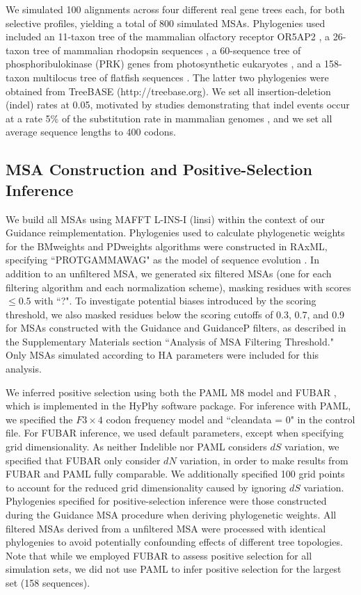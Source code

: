 \documentclass[11pt]{article}
\begin{document}
We simulated 100 alignments across four different real gene trees each, for both selective profiles, yielding a total of 800 simulated MSAs. Phylogenies used included an 11-taxon tree of the mammalian olfactory receptor OR5AP2 \citep{Spielman2013}, a 26-taxon tree of mammalian rhodopsin sequences \citep{Spielman2013}, a 60-sequence tree of phosphoribulokinase (PRK) genes from photosynthetic eukaryotes \citep{Yang2011}, and a 158-taxon multilocus tree of flatfish sequences \citep{Betancur2013}. The latter two phylogenies were obtained from TreeBASE (http://treebase.org). We set all insertion-deletion (indel) rates at 0.05, motivated by studies demonstrating that indel events occur at a rate 5\% of the substitution rate in mammalian genomes \citep{Cooper2004}, and we set all average sequence lengths to 400 codons.

\subsection*{MSA Construction and Positive-Selection Inference}

We build all MSAs using MAFFT L-INS-I (linsi) \citep{Katoh2002,Katoh2005} within the context of our Guidance reimplementation. Phylogenies used to calculate phylogenetic weights for the BMweights and PDweights algorithms were constructed in RAxML, specifying ``PROTGAMMAWAG" as the model of sequence evolution \citep{Stamatakis2006}. In addition to an unfiltered MSA, we generated six filtered MSAs (one for each filtering algorithm and each normalization scheme), masking residues with scores $\leq0.5$ with ``?". To investigate potential biases introduced by the scoring threshold, we also masked residues below the scoring cutoffs of 0.3, 0.7, and 0.9 for MSAs constructed with the Guidance and GuidanceP filters, as described in the Supplementary Materials section ``Analysis of MSA Filtering Threshold." Only MSAs simulated according to HA parameters were included for this analysis.

We inferred positive selection using both the PAML M8 model \citep{Yang2000,Yang2007} and FUBAR \citep{Murrell2013}, which is implemented in the HyPhy \citep{Pond2005} software package. For inference with PAML, we specified the $F3\times4$ codon frequency model and ``cleandata = 0" in the control file. For FUBAR inference, we used default parameters, except when specifying grid dimensionality. As neither Indelible nor PAML considers $dS$ variation, we specified that FUBAR only consider $dN$ variation, in order to make results from FUBAR and PAML fully comparable. We additionally specified 100 grid points to account for the reduced grid dimensionality caused by ignoring $dS$ variation. Phylogenies specified for positive-selection inference were those constructed during the Guidance MSA procedure when deriving phylogenetic weights. All filtered MSAs derived from a unfiltered MSA were processed with identical phylogenies to avoid potentially confounding effects of different tree topologies. Note that while we employed FUBAR to assess positive selection for all simulation sets, we did not use PAML to infer positive selection for the largest set (158 sequences).
\end{document}
